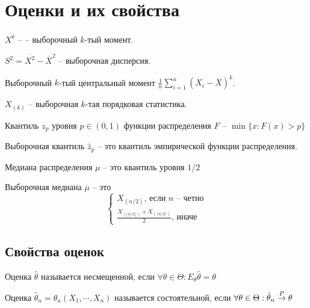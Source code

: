 \documentclass[document.tex]{subfiles}
\begin{document}
\section{Оценки и их свойства}
\begin{definition}
    $\overline{X^k}$ -- -- выборочный $k$-тый момент.
\end{definition}

\begin{definition}
    $S^2 = \overline{X^2} - \overline X^2$ -- выборочная дисперсия.

    Выборочный $k$-тый центральный момент $\frac{1}{n}\sum_{i = 1}^n (X_i - \overline X)^k$.

    $X_(k)$ -- выборочная $k$-тая порядковая статистика.
\end{definition}

\begin{definition}
    Квантиль $z_p$ уровня $p \in (0, 1)$ функции распределения $F$ -- $\min \{x : F(x) > p\}$
\end{definition}

\begin{definition}
    Выборочная квантиль $\hat z_p$ -- это квантиль эмпирической функции распределения.
\end{definition}

\begin{definition}
    Медиана распределения $\mu$ -- это квантиль уровня $1/2$
\end{definition}

\begin{definition}
    Выборочная медиана $\overline \mu$ -- это
    \[
        \begin{cases}
            X_{(n/2)} \text{, если $n$ -- четно} \\
            \frac{X_{(\lfloor n/2 \rfloor)} + X_{( \lceil n/2 \rceil)}}{2} \text{, иначе }
        \end{cases}
    \]
\end{definition}


\subsection{Свойства оценок}

\begin{definition}
    Оценка $\hat \theta$ называется несмещенной, если $\forall \theta \in \Theta: E_{\theta} \hat \theta = \theta$
\end{definition}

\begin{definition}
    Оценка $\hat \theta_n = \theta_n(X_1, \cdots, X_n)$ называется состоятельной, если $\forall \theta \in \Theta:
    \hat \theta_n \stackrel{P}{\rightarrow} \theta$
\end{definition}
\end{document}
